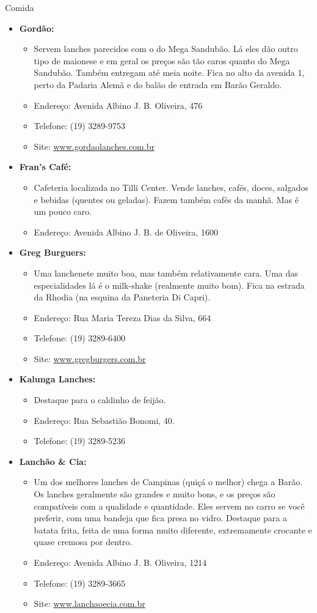 \begin{story}{Comida}
\begin{itemize}
\item \textbf{Gordão:}
\begin{itemize}
\item Servem lanches parecidos com o do Mega Sandubão. Lá eles dão outro tipo de maionese e em geral os preços são tão caros quanto do Mega Sandubão. Também entregam até meia noite. Fica no alto da avenida 1, perto da Padaria Alemã e do balão de entrada em Barão Geraldo.
\item Endereço: Avenida Albino J. B. Oliveira, 476
\item Telefone: (19) 3289-9753
\item Site: \url{www.gordaolanches.com.br}
\end{itemize}

\item  \textbf{Fran's Café:}
\begin{itemize}
\item Cafeteria localizada no Tilli Center. Vende lanches, cafés, doces, salgados e bebidas (quentes ou geladas). Fazem também cafés da manhã. Mas é um pouco caro.
\item Endereço: Avenida Albino J. B. de Oliveira, 1600
\end{itemize}

\item \textbf{Greg Burguers:}
\begin{itemize}
\item Uma lanchenete muito boa, mas também relativamente cara. Uma das especialidades lá é o milk-shake (realmente muito bom). Fica na estrada da Rhodia (na esquina da Paneteria Di Capri).
\item Endereço: Rua Maria Tereza Dias da Silva, 664
\item Telefone: (19) 3289-6400
\item Site: \url{www.gregburgers.com.br}
\end{itemize}

\item \textbf{Kalunga Lanches:}
\begin{itemize}
\item Destaque para o caldinho de feijão. 
\item Endereço: Rua Sebastião Bonomi, 40. 
\item Telefone: (19) 3289-5236
\end{itemize}

\item \textbf{Lanchão \& Cia:}
\begin{itemize}
\item Um dos melhores lanches de Campinas (quiçá o melhor) chega a Barão. Os lanches geralmente são grandes e muito bons, e os preços são compatíveis com a qualidade e quantidade. Eles servem no carro se você preferir, com uma bandeja que fica presa no vidro. Destaque para a batata frita, feita de uma forma muito diferente, extremamente crocante e quase cremosa por dentro.
\item Endereço: Avenida Albino J. B. Oliveira, 1214
\item Telefone: (19) 3289-3665
\item Site: \url{www.lanchaoecia.com.br}
\end{itemize}


\end{itemize}
\end{story}
